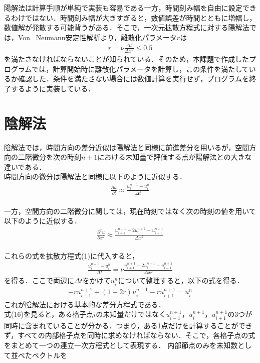 \documentclass[dvipdfmx]{jsarticle}
\begin{document}
陽解法は計算手順が単純で実装も容易である一方，時間刻み幅を自由に設定できるわけではない．時間刻み幅が大きすぎると，数値誤差が時間とともに増幅し，数値解が発散する可能背うがある．そこで，一次元拡散方程式に対する陽解法では，Von \, Neumann安定性解析より，離散化パラメータ$r$は
\begin{align}
  r = \nu \frac{\Delta t}{\Delta x^2} \le 0.5
\end{align}
を満たさなければならないことが知られている．そのため，本課題で作成したプログラムでは，計算開始時に離散化パラメータを計算し，この条件を満たしているか確認した．条件を満たさない場合には数値計算を実行せず，プログラムを終了するように実装している．


\section{陰解法}
陰解法では，時間方向の差分近似は陽解法と同様に前進差分を用いるが，空間方向の二階微分を次の時刻$n+1$における未知量で評価する点が陽解法との大きな違いである．\\

時間方向の微分は陽解法と同様に以下のように近似する．
\begin{align}
  \frac{\partial u}{\partial t} \approx \frac{u_i^{n+1}-u_i^n}{\Delta t}
\end{align}\\

一方，空間方向の二階微分に関しては，現在時刻ではなく次の時刻の値を用いて以下のように近似する．
\begin{align}
  \frac{\partial^2 u}{\partial x^2} \approx \frac{u_{i+1}^{n+1} - 2 u_i^{n+1} + u_{i-1}^{n+1}}{\Delta x^2}
\end{align}\\

これらの式を拡散方程式(1)に代入すると，
\begin{align}
  \frac{u_i^{n+1}-u_i^n}{\Delta t} = \nu \frac{u_{i+1}^{n+1} - 2 u_i^{n+1} + u_{i-1}^{n+1}}{\Delta x^2}
\end{align}
を得る．ここで両辺に$\Delta t$をかけて$u_i^n$について整理すると，以下の式を得る．
\begin{align}
  -ru_{i-1}^{n+1} + (1+2r)u_i^{n+1} -ru_{i+1}^{n+1} = u_i^n
\end{align}
これが陰解法における基本的な差分方程式である．\\

式(16)を見ると，ある格子点$i$の未知量だけではなく$u_{i-1}^{n+1}，u_i^{n+1}，u_{i+1}^{n+1}$の3つが同時に含まれていることが分かる．つまり，ある1点だけを計算することができず，すべての内部格子点を同時に求めなければならない．そこで，各格子点の式をまとめて一つの連立一次方程式として表現する．
内部節点のみを未知数として並べたベクトルを
\end{document}
